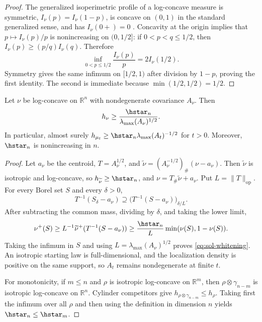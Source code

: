 \documentclass[../main.tex]{subfiles}
\begin{document}
\begin{proof}
The generalized isoperimetric profile of a log-concave measure is symmetric,
$I_\nu(p)=I_\nu(1-p)$, is concave on $(0,1)$ in the standard generalized sense, and has
$I_\nu(0+)=0$ \cite{Bobkov1999LogConcave,Milman2009Isoperimetric}.  Concavity at the origin
implies that $p\mapsto I_\nu(p)/p$ is nonincreasing on $(0,1/2]$: if $0<p<q\leq1/2$, then
$I_\nu(p)\geq(p/q)I_\nu(q)$.  Therefore
\[
  \inf_{0<p\leq1/2}\frac{I_\nu(p)}p=2I_\nu(1/2).
\]
Symmetry gives the same infimum on $[1/2,1)$ after division by $1-p$, proving the first
identity.  The second is immediate because $\min(1/2,1/2)=1/2$.
\end{proof}

\begin{lemma}
\label{lem:sol-whitening}
Let $\nu$ be log-concave on $\mathbb R^n$ with nondegenerate covariance $A_\nu$.  Then
\begin{equation}
  h_\nu\geq\frac{\hstar_n}{\lambda_{\max}(A_\nu)^{1/2}}.
  \label{eq:sol-whitening}
\end{equation}
In particular, almost surely
$h_{\mu_t}\geq\hstar_n\lambda_{\max}(A_t)^{-1/2}$ for $t>0$.  Moreover,
$\hstar_n$ is nonincreasing in $n$.
\end{lemma}

\begin{proof}
Let $a_\nu$ be the centroid, $T=A_\nu^{1/2}$, and
$\widetilde\nu=(A_\nu^{-1/2})_\#(\nu-a_\nu)$.  Then $\widetilde\nu$ is isotropic and
log-concave, so $h_{\widetilde\nu}\geq\hstar_n$, and
$\nu=T_\#\widetilde\nu+a_\nu$.  Put $L=\|T\|_{\mathrm{op}}$.
For every Borel set $S$ and every $\delta>0$,
\[
  T^{-1}(S_\delta-a_\nu)
  \supseteq\bigl(T^{-1}(S-a_\nu)\bigr)_{\delta/L}.
\]
After subtracting the common mass, dividing by $\delta$, and taking the lower limit,
\[
  \nu^+(S)\geq L^{-1}\widetilde\nu^+(T^{-1}(S-a_\nu))
  \geq\frac{\hstar_n}{L}\min(\nu(S),1-\nu(S)).
\]
Taking the infimum in $S$ and using $L=\lambda_{\max}(A_\nu)^{1/2}$ proves
\eqref{eq:sol-whitening}.  An isotropic starting law is full-dimensional, and the localization
density is positive on the same support, so $A_t$ remains nondegenerate at finite $t$.

For monotonicity, if $m\leq n$ and $\rho$ is isotropic log-concave on $\mathbb R^m$, then
$\rho\otimes\gamma_{n-m}$ is isotropic log-concave on $\mathbb R^n$.  Cylinder competitors
give $h_{\rho\otimes\gamma_{n-m}}\leq h_\rho$.  Taking first the infimum over all $\rho$ and
then using the definition in dimension $n$ yields $\hstar_n\leq\hstar_m$.
\end{proof}
\end{document}
